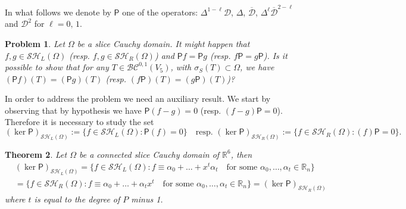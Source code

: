\documentclass[reqno,11pt]{amsart}
\numberwithin{equation}{section}
\newtheorem{theorem}{Theorem}[section]
\newtheorem{prob}[theorem]{Problem}
\theoremstyle{definition}
\begin{document}
In what follows we denote by $\mathsf P$ one of the operators: $\Delta^{1-\ell}\mathcal D$, $\Delta$, $\overline{\mathcal D}$, $\Delta^\ell\overline{\mathcal D}^{2-\ell}$ and $\mathcal D^2$ for $\ell=0,\, 1$.
\begin{prob}
	\label{three}
  Let $ \Omega$ be a slice Cauchy domain. It might happen that $f,g\in \mathcal{SH}_L(\Omega)$ (resp. $f,g\in \mathcal {SH}_R(\Omega)$) and $\mathsf Pf=\mathsf Pg$  (resp. $f\mathsf P=g\mathsf P$). Is it possible to show that for any $T\in\mathcal{BC}^{0,1}(V_5)$, with $\sigma_S(T)\subset \Omega$, we have $(\mathsf Pf)(T)=(\mathsf Pg)(T)$ (resp. $(f\mathsf P)(T)=(g\mathsf P)(T)$)?
\end{prob}	



In order to address the problem  we need an auxiliary result. We start by observing that by hypothesis we have $\mathsf P(f-g)=0$ (resp. $(f-g)\mathsf P=0$).
Therefore it is necessary to study the set
$$ (\ker{\mathsf P})_{\mathcal{SH}_L(\Omega)}:=\{f\in \mathcal{SH}_L(\Omega): \mathsf P(f)=0\}\quad\textrm{resp. $(\ker{\mathsf P})_{\mathcal{SH}_R(\Omega)}:=\{f\in \mathcal{SH}_R(\Omega): (f)\mathsf P=0\}$} .$$
\begin{theorem}\label{Tcost} Let $\Omega$ be a connected slice Cauchy domain of $\mathbb R^6$, then
	\begin{eqnarray*}
		& (\ker{\mathsf P})_{\mathcal{SH}_L(\Omega)} =\{f\in \mathcal{SH}_L(\Omega): f\equiv \alpha_0+\dots+x^t \alpha_t\quad\textrm{for some $\alpha_0,\dots,\alpha_t\in\mathbb R_n$}\}\\
		&=\{f\in \mathcal{SH}_R(\Omega): f\equiv \alpha_0+\dots+\alpha_tx^t\quad\textrm{for some $\alpha_0,\dots,\alpha_t\in\mathbb R_n$}\}=(\ker{\mathsf P})_{\mathcal {SH}_R(\Omega)}
	\end{eqnarray*}
where $t$ is equal to the degree of $P$ minus 1. 	
\end{theorem}
\end{document}
